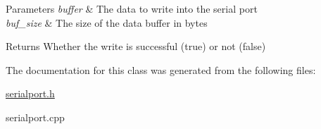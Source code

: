 \begin{DoxyParams}{Parameters}
{\em buffer} & The data to write into the serial port \\
\hline
{\em buf\+\_\+size} & The size of the data buffer in bytes \\
\hline
\end{DoxyParams}
\begin{DoxyReturn}{Returns}
Whether the write is successful (true) or not (false) 
\end{DoxyReturn}


The documentation for this class was generated from the following files\+:\begin{DoxyCompactItemize}
\item 
\mbox{\hyperlink{serialport_8h}{serialport.\+h}}\item 
serialport.\+cpp\end{DoxyCompactItemize}

